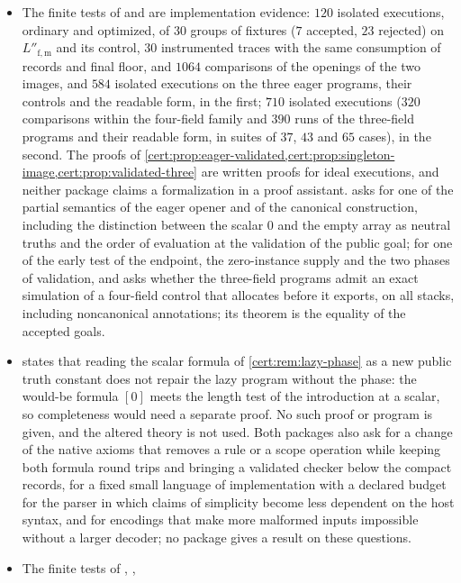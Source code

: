 \begin{itemize}
\item The finite tests of  and 
are implementation evidence: $120$ isolated executions, ordinary and optimized, of
$30$ groups of fixtures ($7$ accepted, $23$ rejected) on $L''_{\mathrm{f,m}}$ and its
control, $30$ instrumented traces with the same consumption of records and final
floor, and $1064$ comparisons of the openings of the two images, and $584$ isolated
executions on the three eager programs, their controls and the readable form, in the
first; $710$ isolated executions ($320$ comparisons within the four-field family and
$390$ runs of the three-field programs and their readable form, in suites of $37$,
$43$ and $65$ cases), in the second. The proofs of
\cref{cert:prop:eager-validated,cert:prop:singleton-image,cert:prop:validated-three}
are written proofs for ideal executions, and neither package claims a formalization
in a proof assistant.  asks for one of the partial semantics
of the eager opener and of the canonical construction, including the distinction
between the scalar $0$ and the empty array as neutral truths and the order of
evaluation at the validation of the public goal;  for
one of the early test of the endpoint, the zero-instance supply and the two phases
of validation, and asks whether the three-field programs admit an exact simulation
of a four-field control that allocates before it exports, on all stacks, including
noncanonical annotations; its theorem is the equality of the accepted goals.
\item {} states that reading the scalar formula of
\cref{cert:rem:lazy-phase} as a new public truth constant does not repair the lazy
program without the phase: the would-be formula $[0]$ meets the length test of the
introduction at a scalar, so completeness would need a separate proof. No such
proof or program is given, and the altered theory is not used. Both packages also
ask for a change of the native axioms that removes a rule or a scope operation
while keeping both formula round trips and bringing a validated checker below the
compact records, for a fixed small language of implementation with a declared
budget for the parser in which claims of simplicity become less dependent on the
host syntax, and for encodings that make more malformed inputs impossible without a
larger decoder; no package gives a result on these questions.
\item The finite tests of , ,

\end{itemize}
